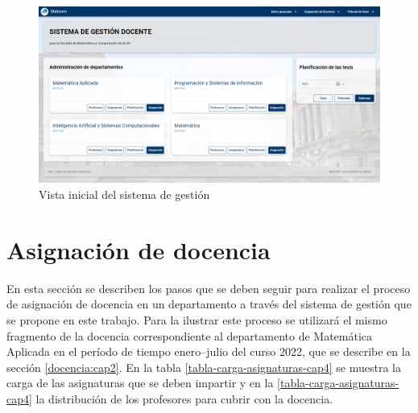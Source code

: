   


\begin{figure}[H]
    \includegraphics[scale=0.3]{Graphics/Implementation/Home-page.png}
    \caption{Vista inicial del sistema de gestión}
    \label{img-home-page}
\end{figure}






\section{Asignación de docencia}\label{cap4:docencia}




En esta sección se describen los pasos que se deben seguir para realizar 
el proceso de asignación de docencia en un departamento a través del sistema 
de gestión que se propone en este trabajo. 
Para la ilustrar este proceso se utilizará 
el mismo fragmento de la docencia correspondiente al departamento
de Matemática Aplicada en el período de tiempo 
enero--julio del curso 2022, que se describe en la sección \ref{docencia:cap2}. 
En la tabla \ref{tabla-carga-asignaturas-cap4} 
se muestra la carga de las asignaturas que se deben impartir
y en la \ref{tabla-carga-asignaturas-cap4} 
la distribución de los profesores
para cubrir con la docencia. 


